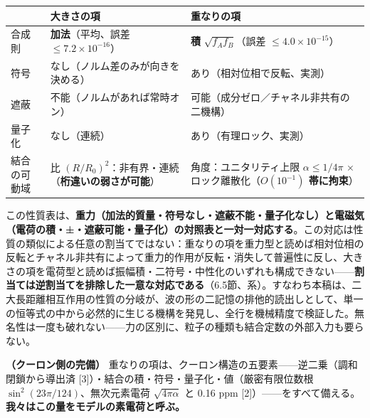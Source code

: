 \documentclass[
  a4paper,
]{ltjsarticle}
\newcounter{none} %
\begin{document}
{\def\LTcaptype{none} %
\begin{longtable}[]{@{}
  >{\raggedright\arraybackslash}p{}
  >{\raggedright\arraybackslash}p{}
  >{\raggedright\arraybackslash}p{}@{}}
\toprule\noalign{}
\begin{minipage}[b]{\linewidth}\raggedright
\end{minipage} & \begin{minipage}[b]{\linewidth}\raggedright
大きさの項
\end{minipage} & \begin{minipage}[b]{\linewidth}\raggedright
重なりの項
\end{minipage} \\
\midrule\noalign{}
\endhead
\bottomrule\noalign{}
\endlastfoot
合成則 & \textbf{加法}（平均、誤差 \(\le7.2\times10^{-16}\)） &
\textbf{積} \(\sqrt{f_Af_B}\)（誤差 \(\le4.0\times10^{-15}\)） \\
符号 & なし（ノルム差のみが向きを決める） &
あり（相対位相で反転、実測） \\
遮蔽 & 不能（ノルムがあれば常時オン） &
可能（成分ゼロ／チャネル非共有の二機構） \\
量子化 & なし（連続） & あり（有理ロック、実測） \\
結合の可動域 & 比
\((R/R_0)^2\)：非有界・連続（\textbf{桁違いの弱さが可能}） &
角度：ユニタリティ上限 \(\alpha\le1/4\pi\) ×
ロック離散化（\textbf{\(O(10^{-1})\) 帯に拘束}） \\
\end{longtable}
}

この性質表は、\textbf{重力（加法的質量・符号なし・遮蔽不能・量子化なし）と電磁気（電荷の積・±・遮蔽可能・量子化）の対照表と一対一対応する}。この対応は性質の類似による任意の割当てではない：重なりの項を重力型と読めば相対位相の反転とチャネル非共有によって重力的作用が反転・消失して普遍性に反し、大きさの項を電荷型と読めば振幅積・二符号・中性化のいずれも構成できない------\textbf{割当ては逆割当てを排除した一意な対応である}（6.5節、系）。すなわち本稿は、二大長距離相互作用の性質の分岐が、波の形の二記憶の排他的読出しとして、単一の恒等式の中から必然的に生じる機構を発見し、全行を機械精度で検証した。無名性は一度も破れない------力の区別に、粒子の種類も結合定数の外部入力も要らない。

\textbf{（クーロン側の完備）}
重なりの項は、クーロン構造の五要素------逆二乗（調和閉鎖から導出済
{[}3{]}）・結合の積・符号・量子化・値（厳密有限位数根
\(\sin^2(23\pi/124)\)、無次元素電荷 \(\sqrt{4\pi\alpha}\) と 0.16 ppm
{[}2{]}）------をすべて備える。\textbf{我々はこの量をモデルの素電荷と呼ぶ。}
\end{document}
